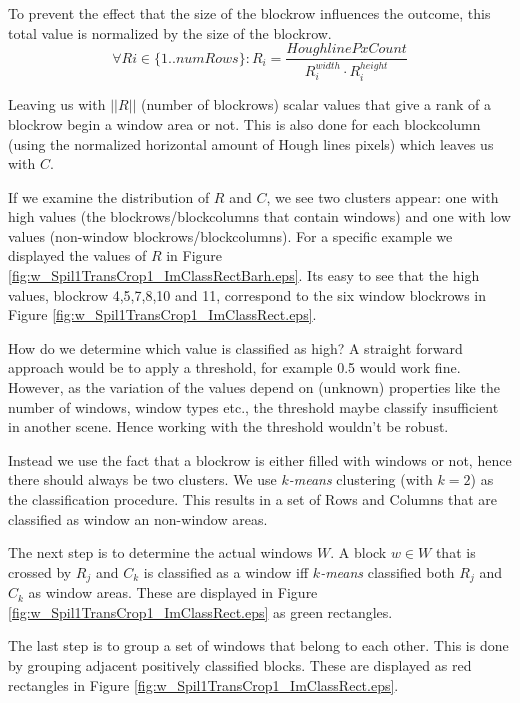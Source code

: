 To prevent the effect that the size of the blockrow influences the outcome, this total value
is normalized by the size of the blockrow.
\[\forall Ri\in \{1..numRows\} : R_i = \frac{HoughlinePxCount}{R_i^{width} \cdot R_i^{height}}\]

Leaving us with $||R||$ (number of blockrows) scalar values that give a rank of a blockrow begin a window area or not.
This is also done for each blockcolumn (using the normalized horizontal amount of
Hough lines pixels) which leaves us with $C$.

If we examine the distribution of $R$ and $C$, we see two clusters appear: one with
high values (the blockrows/blockcolumns that contain windows) and one with low
values (non-window blockrows/blockcolumns). For a specific example we displayed the values of $R$ in Figure \ref{fig:w_Spil1TransCrop1_ImClassRectBarh.eps}.
Its easy to see that the high values, blockrow 4,5,7,8,10 and 11, correspond to the
six window blockrows in Figure \ref{fig:w_Spil1TransCrop1_ImClassRect.eps}.

How do we determine which value is classified as high?  A straight forward
approach would be to apply a threshold, for example 0.5 would work fine.
However, as the variation of the values depend on (unknown) properties like the
number of windows, window types etc., the threshold maybe classify insufficient
in another scene.  Hence working with the threshold wouldn't be robust. 

Instead we use the fact that a blockrow is either filled with windows or not, hence
there should always be two clusters.  We use \emph{$k$-means} clustering (with
$k=2$) as the classification procedure.
This results in a set of Rows and Columns that are classified as window an
non-window areas.

The next step is to determine the actual windows $W$.
A block $w\in W$ that is crossed by $R_j$ and $C_k$ is classified as a
window iff \emph{$k$-means} classified both $R_j$ and $C_k$ as window areas. These are displayed in 
 Figure \ref{fig:w_Spil1TransCrop1_ImClassRect.eps} as green rectangles.

The last step is to group a set of windows that belong to each other. This is done by 
grouping adjacent positively classified blocks. These are displayed as red
rectangles in Figure \ref{fig:w_Spil1TransCrop1_ImClassRect.eps}.

